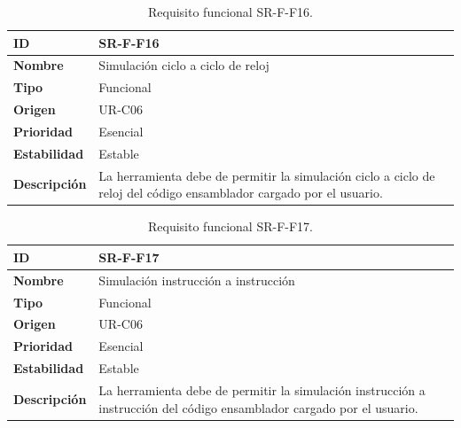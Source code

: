 \begin{center}
\begin{table}[htbp]
\centering
\caption{Requisito funcional SR-F-F16.}
\begin{tabular}{@{}p{2.5cm} p{9cm}@{}} 
\toprule
\textbf{ID} 				& SR-F-F16 \\
\midrule
\textbf{Nombre} 			& Simulación ciclo a ciclo de reloj\\
\midrule
\textbf{Tipo} 			& Funcional \\
\midrule
\textbf{Origen} 			& UR-C06 \\
\midrule
\textbf{Prioridad}		& Esencial \\
\midrule
\textbf{Estabilidad} 		& Estable \\
\midrule
\textbf{Descripción} 	& La herramienta debe de permitir la simulación ciclo a ciclo de reloj del código \gls{ensamblador} cargado por el usuario. \\
\bottomrule
\end{tabular}
\label{tab:srff16}
\end{table}
\end{center}

\begin{center}
\begin{table}[htbp]
\centering
\caption{Requisito funcional SR-F-F17.}
\begin{tabular}{@{}p{2.5cm} p{9cm}@{}} 
\toprule
\textbf{ID} 				& SR-F-F17 \\
\midrule
\textbf{Nombre} 			& Simulación instrucción a instrucción\\
\midrule
\textbf{Tipo} 			& Funcional \\
\midrule
\textbf{Origen} 			& UR-C06 \\
\midrule
\textbf{Prioridad}		& Esencial \\
\midrule
\textbf{Estabilidad} 		& Estable \\
\midrule
\textbf{Descripción} 	& La herramienta debe de permitir la simulación instrucción a instrucción del código \gls{ensamblador} cargado por el usuario. \\
\bottomrule
\end{tabular}
\label{tab:srff17}
\end{table}
\end{center}

